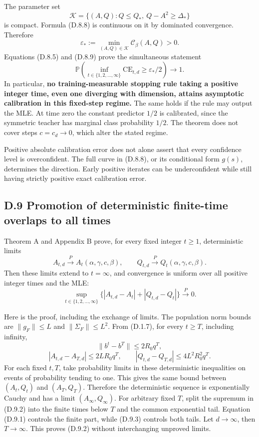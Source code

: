 \documentclass[
  11pt,
  a4paper,
]{article}
\begin{document}
The parameter set \[
\mathcal K=\{(A,Q): Q\leq Q_*,\ Q-A^2\geq\Delta_*\}
\tag{D.8.10}
\] is compact. Formula (D.8.8) is continuous on it by dominated
convergence. Therefore \[
\varepsilon_*:=\min_{(A,Q)\in\mathcal K}\mathcal C_\beta(A,Q)>0.
\tag{D.8.11}
\] Equations (D.8.5) and (D.8.9) prove the simultaneous statement \[
\mathbb P\!\left(
\inf_{t\in\{1,2,\ldots,\infty\}}\mathrm{CE}_{t,d}
\geq\varepsilon_*/2\right)\longrightarrow1.
\tag{D.8.12}
\] In particular, \textbf{no training-measurable stopping rule taking a
positive integer time, even one diverging with dimension, attains
asymptotic calibration in this fixed-step regime.} The same holds if the
rule may output the MLE. At time zero the constant predictor \(1/2\) is
calibrated, since the symmetric teacher has marginal class probability
\(1/2\). The theorem does not cover steps \(c=c_d\to0\), which alter the
stated regime.

Positive absolute calibration error does not alone assert that every
confidence level is overconfident. The full curve in (D.8.8), or its
conditional form \(g(s)\), determines the direction. Early positive
iterates can be underconfident while still having strictly positive
exact calibration error.

\hypertarget{d.9-promotion-of-deterministic-finite-time-overlaps-to-all-times}{%
\subsection{D.9 Promotion of deterministic finite-time overlaps to all
times}\label{d.9-promotion-of-deterministic-finite-time-overlaps-to-all-times}}

Theorem A and Appendix B prove, for every fixed integer \(t\geq1\),
deterministic limits \[
A_{t,d}\xrightarrow{P}A_t(\alpha,\gamma,c,\beta),\qquad
Q_{t,d}\xrightarrow{P}Q_t(\alpha,\gamma,c,\beta).
\tag{D.9.1}
\] Then these limits extend to \(t=\infty\), and convergence is uniform
over all positive integer times and the MLE: \[
\sup_{t\in\{1,2,\ldots,\infty\}}
\big\{|A_{t,d}-A_t|+|Q_{t,d}-Q_t|\big\}\xrightarrow{P}0.
\tag{D.9.2}
\]

Here is the proof, including the exchange of limits. The population norm
bounds are \(\|g_F\|\leq L\) and \(\|\Sigma_F\|\leq L^2\). From (D.1.7),
for every \(t\geq T\), including infinity, \[
\|b^t-b^T\|\leq2R_0q^T,
\] \[
|A_{t,d}-A_{T,d}|\leq2LR_0q^T,
\qquad
|Q_{t,d}-Q_{T,d}|\leq4L^2R_0^2q^T.
\tag{D.9.3}
\] For each fixed \(t,T\), take probability limits in these
deterministic inequalities on events of probability tending to one. This
gives the same bound between \((A_t,Q_t)\) and \((A_T,Q_T)\). Therefore
the deterministic sequence is exponentially Cauchy and has a limit
\((A_\infty,Q_\infty)\). For arbitrary fixed \(T\), split the supremum
in (D.9.2) into the finite times below \(T\) and the common exponential
tail. Equation (D.9.1) controls the finite part, while (D.9.3) controls
both tails. Let \(d\to\infty\), then \(T\to\infty\). This proves (D.9.2)
without interchanging unproved limits.
\end{document}
